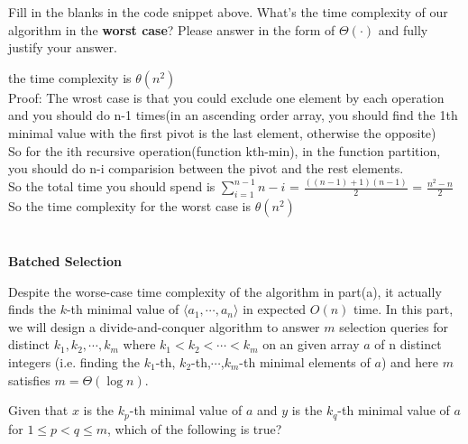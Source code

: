 \begin{parts}
\begin{subparts}
    \subpart[2] Fill in the blanks in the code snippet above.
    \subpart[2] What's the time complexity of our algorithm in the \textbf{worst case}? Please answer in the form of \(\Theta(\cdot)\) and fully justify your answer.
    \begin{solution}
    the time complexity is $\theta(n^{2})$\\
    Proof:
    The wrost case is that you could exclude one element by each operation and you should do n-1 times(in an ascending order array, you should find the 1th minimal value with the first pivot is the last element, otherwise the opposite)\\
    So for the ith recursive operation(function kth-min), in the function partition, you should do n-i comparision between the pivot and the rest elements.\\
    So the total time you should spend is $\sum_{i=1}^{n-1}n-i$ = $\frac{((n-1)+1)(n-1)}{2}$ = $\frac{n^{2}-n}{2}$\\
    So the time complexity for the worst case is $\theta(n^{2})$\\
    \end{solution}
\end{subparts}

\newpage

\part{} \textbf{Batched Selection} \par

Despite the worse-case time complexity of the algorithm in part(a), it actually finds the $k$-th minimal value of \(\langle a_1,\cdots,a_n\rangle\) in expected $O(n)$ time. In this part, we will design a divide-and-conquer algorithm to answer $m$ selection queries for distinct $k_1, k_2, \cdots, k_m$ where $k_1 < k_2 < \cdots < k_m$ on an given array $a$ of n distinct integers (i.e. finding the $k_1$-th, $k_2$-th,$\cdots$,$k_m$-th minimal elements of $a$) and here $m$ satisfies $m = \Theta(\log n)$.

\begin{subparts}
    \subpart[1] Given that $x$ is the $k_p$-th minimal value of $a$ and $y$ is the $k_q$-th minimal value of $a$ for $1 \leq p < q \leq m$, which of the following is true?
    

\end{subparts}
\end{parts}
